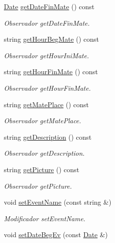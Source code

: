 \begin{DoxyCompactItemize}
\hyperlink{class_date}{Date} \hyperlink{class_event_a8676a4856cdb6e84f78ca1fa9988b2ca}{get\+Date\+Fin\+Mate} () const 
\begin{DoxyCompactList}\small\item\em Observador get\+Date\+Fin\+Mate. \end{DoxyCompactList}\item 
string \hyperlink{class_event_a4af495239d3df5bc408de9dfe7c13acf}{get\+Hour\+Beg\+Mate} () const 
\begin{DoxyCompactList}\small\item\em Observador get\+Hour\+Ini\+Mate. \end{DoxyCompactList}\item 
string \hyperlink{class_event_ab0b79d0fde419c36eeddce0974aa29b0}{get\+Hour\+Fin\+Mate} () const 
\begin{DoxyCompactList}\small\item\em Observador get\+Hour\+Fin\+Mate. \end{DoxyCompactList}\item 
string \hyperlink{class_event_a8dfff443f2f78fd86705afe00b8e0489}{get\+Mate\+Place} () const 
\begin{DoxyCompactList}\small\item\em Observador get\+Mate\+Place. \end{DoxyCompactList}\item 
string \hyperlink{class_event_aaaf95f81e1f746ef936bacb569306b05}{get\+Description} () const 
\begin{DoxyCompactList}\small\item\em Observador get\+Description. \end{DoxyCompactList}\item 
string \hyperlink{class_event_aa85b8f3c2d3f220e87b80396767fc746}{get\+Picture} () const 
\begin{DoxyCompactList}\small\item\em Observador get\+Picture. \end{DoxyCompactList}\item 
void \hyperlink{class_event_a0179974f9b98be16e783ebe699be1ae6}{set\+Event\+Name} (const string \&)\hypertarget{class_event_a0179974f9b98be16e783ebe699be1ae6}{}\label{class_event_a0179974f9b98be16e783ebe699be1ae6}

\begin{DoxyCompactList}\small\item\em Modificador set\+Event\+Name. \end{DoxyCompactList}\item 
void \hyperlink{class_event_a648619c04d7907a0d1f1cc48a051c196}{set\+Date\+Beg\+Ev} (const \hyperlink{class_date}{Date} \&)\hypertarget{class_event_a648619c04d7907a0d1f1cc48a051c196}{}\label{class_event_a648619c04d7907a0d1f1cc48a051c196}


\end{DoxyCompactItemize}
